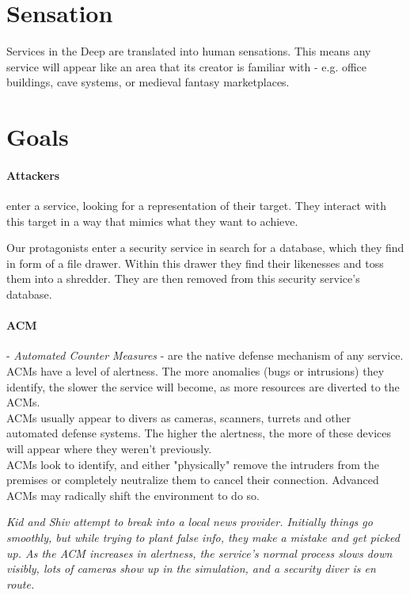 \documentclass[12pt,a4paper,openany,usenames,dvipsnames]{book}
\begin{document}
	\section{Sensation}
	Services in the Deep are translated into human sensations.
	This means any service will appear like an area that its creator is familiar with
		- e.g. office buildings, cave systems, or medieval fantasy marketplaces.
	\section{Goals}
	\paragraph{Attackers}
		enter a service, looking for a representation of their target.
		They interact with this target in a way that mimics what they want to achieve.
		\begin{exampleblock}
			Our protagonists enter a security service in search for a database,
				which they find in form of a file drawer.
			Within this drawer they find their likenesses and toss them into a shredder.
			They are then removed from this security service's database.
		\end{exampleblock}
	\paragraph{ACM}
		- \emph{Automated Counter Measures} - are the native defense mechanism of any service.
		ACMs have a level of alertness.
		The more anomalies (bugs or intrusions) they identify, the slower the service will become,
			as more resources are diverted to the ACMs.
		\\%
		ACMs usually appear to divers as cameras, scanners, turrets and other automated defense systems.
		The higher the alertness, the more of these devices will appear where they weren't previously.
		\\%
		ACMs look to identify,
			and either "physically" remove the intruders from the premises
            or completely neutralize them to cancel their connection.
		Advanced ACMs may radically shift the environment to do so.
		\begin{exampleblock}
			\itshape
			Kid and Shiv attempt to break into a local news provider.
			Initially things go smoothly,
				but while trying to plant false info,
				they make a mistake and get picked up.
			As the ACM increases in alertness,
				the service's normal process slows down visibly,
				lots of cameras show up in the simulation,
				and a security diver is en route.
		\end{exampleblock}
\end{document}
